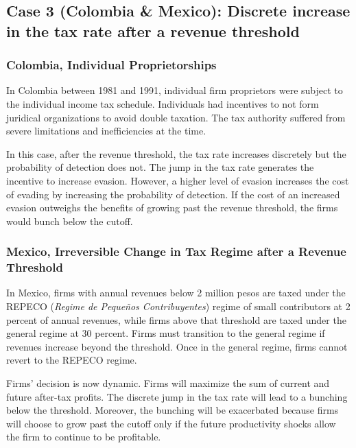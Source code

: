 \documentclass[
  12pt]{article}
\theoremstyle{definition}
\theoremstyle{remark}
\begin{document}
\subsection{Case 3 (Colombia \& Mexico): Discrete increase in the tax
rate after a revenue
threshold}\label{case-3-colombia-mexico-discrete-increase-in-the-tax-rate-after-a-revenue-threshold}

\subsubsection{Colombia, Individual
Proprietorships}\label{colombia-individual-proprietorships}

In Colombia between 1981 and 1991, individual firm proprietors were
subject to the individual income tax schedule. Individuals had
incentives to not form juridical organizations to avoid double taxation.
The tax authority suffered from severe limitations and inefficiencies at
the time.

In this case, after the revenue threshold, the tax rate increases
discretely but the probability of detection does not. The jump in the
tax rate generates the incentive to increase evasion. However, a higher
level of evasion increases the cost of evading by increasing the
probability of detection. If the cost of an increased evasion outweighs
the benefits of growing past the revenue threshold, the firms would
bunch below the cutoff.

\subsubsection{Mexico, Irreversible Change in Tax Regime after a Revenue
Threshold}\label{mexico-irreversible-change-in-tax-regime-after-a-revenue-threshold}

In Mexico, firms with annual revenues below 2 million pesos are taxed
under the REPECO (\emph{Regime de Pequeños Contribuyentes}) regime of
small contributors at 2 percent of annual revenues, while firms above
that threshold are taxed under the general regime at 30 percent. Firms
must transition to the general regime if revenues increase beyond the
threshold. Once in the general regime, firms cannot revert to the REPECO
regime.

Firms' decision is now dynamic. Firms will maximize the sum of current
and future after-tax profits. The discrete jump in the tax rate will
lead to a bunching below the threshold. Moreover, the bunching will be
exacerbated because firms will choose to grow past the cutoff only if
the future productivity shocks allow the firm to continue to be
profitable.
\end{document}
